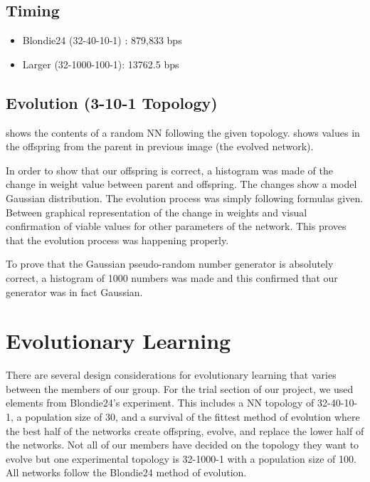 \documentclass{article}
\begin{document}
\subsection{Timing}

\begin{itemize}
    \item Blondie24 (32-40-10-1)   : 879,833 bps
    \item Larger    (32-1000-100-1): 13762.5 bps
\end{itemize}

\subsection{Evolution (3-10-1 Topology)}

 shows the contents of a random
NN following the given topology.  shows values in the offspring from the
parent in previous image (the evolved network).

In order to show that our offspring is correct, a
histogram was made of the change in weight value between parent and offspring. The
changes show a model Gaussian distribution. The evolution process was simply following formulas
given. Between graphical representation of the change in weights and visual
confirmation of viable values for other parameters of the network. This proves that
the evolution process was happening properly.

To prove that the Gaussian pseudo-random number generator is absolutely correct, 
a histogram of 1000 numbers was made and this confirmed that our generator was in fact Gaussian.

\section{Evolutionary Learning}

There are several design considerations for evolutionary
learning that varies between the members of our group. For the trial section of
our project, we used elements from Blondie24’s experiment. This includes a
NN topology of 32-40-10-1, a population size of 30, and a survival of the
fittest method of evolution where the best half of the networks create
offspring, evolve, and replace the lower half of the networks. Not all of our
members have decided on the topology they want to evolve but one experimental
topology is 32-1000-1 with a population size of 100. All networks follow the
Blondie24 method of evolution.
\end{document}
